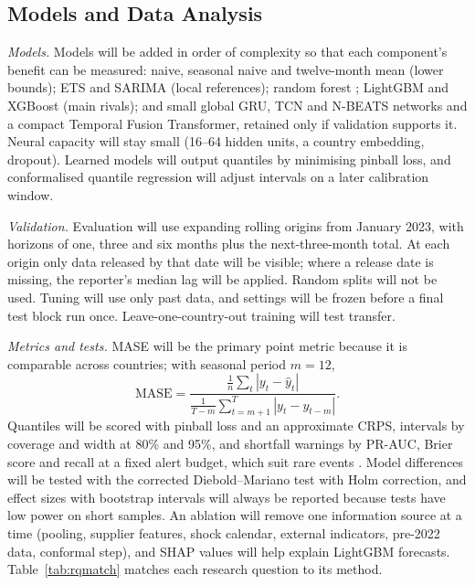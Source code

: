 \documentclass[conference]{IEEEtran}
\begin{document}
\subsection{Models and Data Analysis}
\emph{Models.} Models will be added in order of complexity so that each component's benefit can be measured: naive, seasonal naive and twelve-month mean (lower bounds); ETS and SARIMA (local references); random forest \cite{breiman2001}; LightGBM and XGBoost (main rivals); and small global GRU, TCN and N-BEATS networks and a compact Temporal Fusion Transformer, retained only if validation supports it. Neural capacity will stay small (16--64 hidden units, a country embedding, dropout). Learned models will output quantiles by minimising pinball loss, and conformalised quantile regression \cite{romano2019} will adjust intervals on a later calibration window.

\emph{Validation.} Evaluation will use expanding rolling origins from January 2023, with horizons of one, three and six months plus the next-three-month total. At each origin only data released by that date will be visible; where a release date is missing, the reporter's median lag will be applied. Random splits will not be used. Tuning will use only past data, and settings will be frozen before a final test block run once. Leave-one-country-out training will test transfer.

\emph{Metrics and tests.} MASE \cite{hyndman2006} will be the primary point metric because it is comparable across countries; with seasonal period $m=12$,
\begin{equation}
\mathrm{MASE}=\frac{\frac{1}{n}\sum_{t}|y_t-\hat y_t|}{\frac{1}{T-m}\sum_{t=m+1}^{T}|y_t-y_{t-m}|}. \label{eq:mase}
\end{equation}
Quantiles will be scored with pinball loss and an approximate CRPS, intervals by coverage and width at 80\% and 95\%, and shortfall warnings by PR-AUC, Brier score \cite{brier1950} and recall at a fixed alert budget, which suit rare events \cite{saito2015}. Model differences will be tested with the corrected Diebold--Mariano test \cite{harvey1997} with Holm correction, and effect sizes with bootstrap intervals will always be reported because tests have low power on short samples. An ablation will remove one information source at a time (pooling, supplier features, shock calendar, external indicators, pre-2022 data, conformal step), and SHAP values \cite{lundberg2017} will help explain LightGBM forecasts. Table~\ref{tab:rqmatch} matches each research question to its method.
\end{document}
